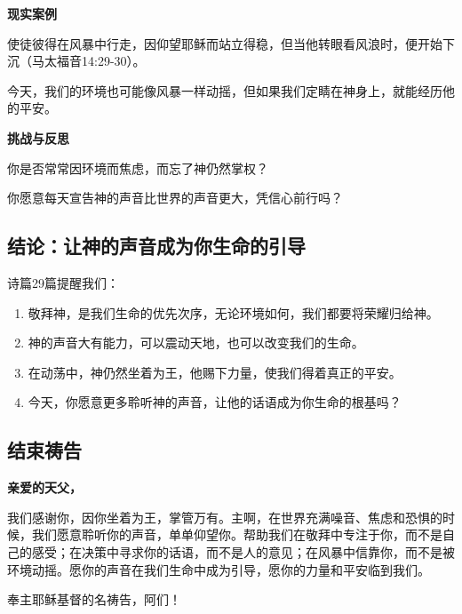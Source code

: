 \documentclass[a4paper, 12pt]{article}
\begin{document}
\vspace{0.2cm}

\textbf{现实案例}

\hspace{0.6cm}使徒彼得在风暴中行走，因仰望耶稣而站立得稳，但当他转眼看风浪时，便开始下沉（马太福音14:29-30）。

\hspace{0.6cm}今天，我们的环境也可能像风暴一样动摇，但如果我们定睛在神身上，就能经历他的平安。

\vspace{0.2cm}

\textbf{挑战与反思}

\hspace{0.6cm}你是否常常因环境而焦虑，而忘了神仍然掌权？

\hspace{0.6cm}你愿意每天宣告神的声音比世界的声音更大，凭信心前行吗？


\subsection*{结论：让神的声音成为你生命的引导}
诗篇29篇提醒我们：
\begin{enumerate}
    \item 敬拜神，是我们生命的优先次序，无论环境如何，我们都要将荣耀归给神。
    \item 神的声音大有能力，可以震动天地，也可以改变我们的生命。

    \item 在动荡中，神仍然坐着为王，他赐下力量，使我们得着真正的平安。

    \item 今天，你愿意更多聆听神的声音，让他的话语成为你生命的根基吗？

\end{enumerate}


\subsection*{结束祷告}

\textbf{亲爱的天父，}

我们感谢你，因你坐着为王，掌管万有。主啊，在世界充满噪音、焦虑和恐惧的时候，我们愿意聆听你的声音，单单仰望你。帮助我们在敬拜中专注于你，而不是自己的感受；在决策中寻求你的话语，而不是人的意见；在风暴中信靠你，而不是被环境动摇。愿你的声音在我们生命中成为引导，愿你的力量和平安临到我们。

奉主耶稣基督的名祷告，阿们！
\newpage
\end{document}
